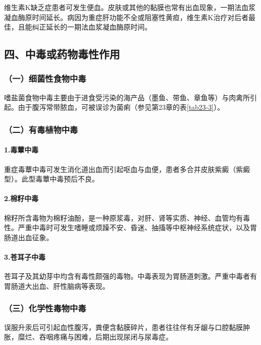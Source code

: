 维生素K缺乏症患者可发生便血。皮肤或其他的黏膜也常有出血现象，一期法血浆凝血酶原时间延长。病因为重症肝功能不全或阻塞性黄疸，维生素K治疗对后者最佳，且能纠正延长的一期法血浆凝血酶原时间。

\subsection{四、中毒或药物毒性作用}

\subsubsection{（一）细菌性食物中毒}

嗜盐菌食物中毒主要由于进食受污染的海产品（墨鱼、带鱼、章鱼等）与肉禽所引起。由于腹泻常带脓血，可被误诊为菌痢（参见第23章的表\ref{tab23-3}）。

\subsubsection{（二）有毒植物中毒}

\paragraph{1.毒蕈中毒}

重症毒蕈中毒可发生消化道出血而引起呕血与血便，患者多合并皮肤紫癜（紫癜型）。此型毒蕈中毒预后不良。

\paragraph{2.棉籽中毒}

棉籽所含毒物为棉籽油酚，是一种原浆毒，对肝、肾等实质、神经、血管均有毒性。严重中毒时可发生嗜睡或烦躁不安、昏迷、抽搐等中枢神经系统症状，以及胃肠道出血征象。

\paragraph{3.苍耳子中毒}

苍耳子及其幼芽中均含有毒性颇强的毒物。中毒表现为胃肠道刺激。严重中毒者有胃肠道大出血、肝性脑病等表现。

\subsubsection{（三）化学性毒物中毒}

误服升汞后可引起血性腹泻，粪便含黏膜碎片，患者往往伴有牙龈与口腔黏膜肿胀，糜烂、吞咽疼痛与困难，后期出现尿闭与尿毒症。

